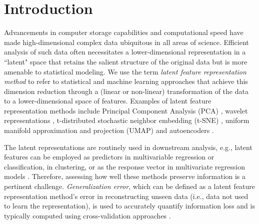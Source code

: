\section{Introduction}

Advancements in computer storage capabilities and computational speed have made high-dimensional complex data ubiquitous in all areas of science.
Efficient analysis of such data often necessitates a lower-dimensional representation in a ``latent" space that retains the salient structure of the original data but is more amenable to statistical modeling.
We use the term \emph{latent feature representation method} to refer to statistical and machine learning approaches that achieve this dimension reduction through a (linear or non-linear) transformation of the data to a lower-dimensional space of features.
Examples of latent feature representation methods include Principal Component Analysis (PCA) \parencite{hotelling_analysis_1933}, wavelet representations \parencite{daubechies_wavelet_1990}, t-distributed stochastic neighbor embedding (t-SNE) \parencite{maaten_visualizing_2008}, uniform manifold approximation and projection (UMAP) \parencite{mcinnes_umap_2020} and autoencoders \parencite{rumelhart_learning_1986}.

The latent representations are routinely used in downstream analysis, e.g., latent features can be employed as predictors in multivariable regression or classification, in clustering, or as the response vector in multivariate regression models \parencite{niu_dimensionality_2011,wang_role_2014,cook_fisher_2007}. 
Therefore, assessing how well these methods preserve information is a pertinent challenge.
\emph{Generalization error}, which can be defined as a latent feature representation method's error in reconstructing unseen data (i.e., data not used to learn the representation), is used to accurately quantify information loss and is typically computed using cross-validation approaches \parencite[see, e.g.,][]{becht_dimensionality_2019, bro_cross-validation_2008, wold_cross-validatory_1978, eastment_cross-validatory_1982,krzanowski_cross-validation_1987, minka_automatic_2000, rajan_bayesian_1994, camacho_cross-validation_2014, diana_cross-validation_2002, hubert_fast_2007, josse_selecting_2012, saccenti_use_2015}.

